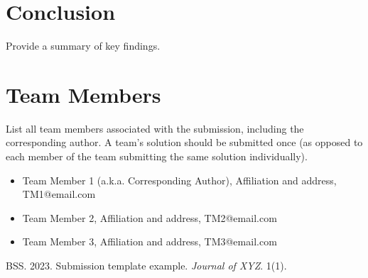\documentclass[competition,nonblindrev]{informs3-competition}
\begin{document}
\section{Conclusion}

Provide a summary of key findings.

\section{Team Members}

List all team members associated with the submission, including the corresponding author. A team’s solution should be submitted once (as opposed to each member of the team submitting the same solution individually).

\begin{itemize}
\item Team Member 1 (a.k.a. Corresponding Author), Affiliation and address, TM1@email.com
\item Team Member 2, Affiliation and address, TM2@email.com
\item Team Member 3, Affiliation and address, TM3@email.com
\end{itemize}








\begin{thebibliography}{}
BSS. 2023. Submission template example. \textit{Journal of XYZ}. 1(1).
\end{thebibliography}

\end{document}
